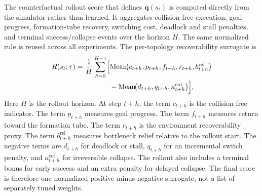 \documentclass{ieeeaccess}
\begin{document}
The counterfactual rollout score that defines $\mathbf{q}(s_t)$ is
computed directly from the simulator rather than learned. It aggregates
collision-free execution, goal progress, formation-tube recovery,
switching cost, deadlock and stall penalties, and terminal
success/collapse events over the horizon $H$. The same normalized rule
is reused across all experiments. The per-topology recoverability
surrogate is
\begin{equation}
\begin{aligned}
R(s_t;\tau) = \frac{1}{H}\sum_{h=0}^{H-1}
\Bigl[
 &\mathrm{Mean}\!\bigl(c_{t+h},p_{t+h},f_{t+h},r_{t+h},b^{\mathrm{rel}}_{t+h}\bigr) \\
 &- \mathrm{Mean}\!\bigl(d_{t+h},q_{t+h},\kappa^{\mathrm{col}}_{t+h}\bigr)
\Bigr],
\end{aligned}
\label{eq:recoverability}
\end{equation}
Here $H$ is the rollout horizon. At step $t+h$, the term $c_{t+h}$ is
the collision-free indicator. The term $p_{t+h}$ measures goal
progress. The term $f_{t+h}$ measures return toward the formation tube.
The term $r_{t+h}$ is the environment recoverability proxy. The term
$b^{\mathrm{rel}}_{t+h}$ measures bottleneck relief relative to the
rollout start. The negative terms are $d_{t+h}$ for deadlock or stall,
$q_{t+h}$ for an incremental switch penalty, and
$\kappa^{\mathrm{col}}_{t+h}$ for irreversible collapse. The rollout
also includes a terminal bonus for early success and an extra penalty
for delayed collapse. The final score is therefore one normalized
positive-minus-negative surrogate, not a list of separately tuned
weights.
\end{document}
